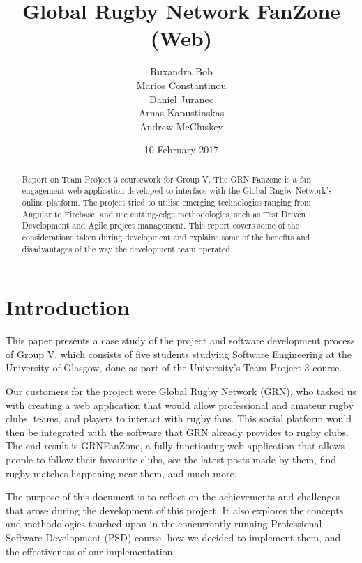 \documentclass{l3proj}
\begin{document}
\title{Global Rugby Network FanZone (Web)}
\author{Ruxandra Bob \\
		Marios Constantinou \\
        Daniel Juranec \\
        Arnas Kapustinskas \\
        Andrew McCluskey}
\date{10 February 2017}
\maketitle
\begin{abstract}
Report on Team Project 3 coursework for Group V. The GRN Fanzone is a
 fan engagement web application developed to interface with the Global Rugby
 Network's online platform. The project tried to utilise
 emerging technologies ranging from Angular to Firebase, and use
 cutting-edge methodologies, such as Test Driven Development and Agile
 project management. This report covers some of the considerations taken
 during development and explains some of the benefits and disadvantages
 of the way the development team operated.
\end{abstract}
\educationalconsent
\newpage
\tableofcontents
\newpage
\section{Introduction}


This paper presents a case study of the project and software development process
 of Group V, which consists of five students studying Software Engineering at the
 University of Glasgow, done as part of the University's Team Project 3 course.

Our customers for the project were Global Rugby Network (GRN), who tasked us
 with creating a web application that would allow professional and amateur
 rugby clubs, teams, and players to interact with rugby fans. This social
 platform would then be integrated with the software that GRN already provides
 to rugby clubs. The end result is GRNFanZone, a fully functioning web application
 that allows people to follow their favourite clubs, see the latest posts
 made by them, find rugby matches happening near them, and much more.

The purpose of this document is to reflect on the achievements and challenges
 that arose during the development of this project. It also explores the concepts
 and methodologies touched upon in the concurrently running Professional Software
 Development (PSD) course, how we decided to implement them, and the effectiveness
 of our implementation.
\end{document}
